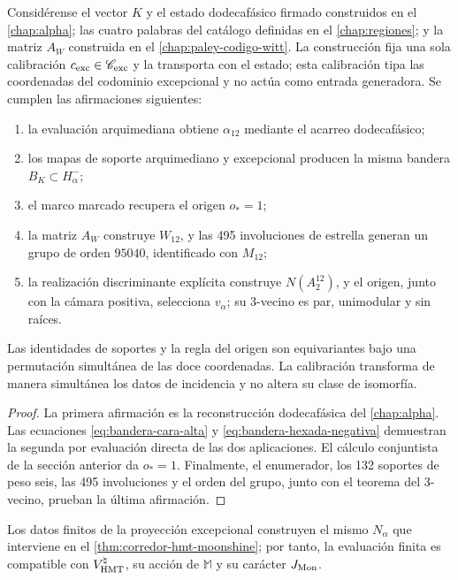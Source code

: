 \begin{theorem}
Considérense el vector \(K\) y el estado dodecafásico firmado construidos en
el \cref{chap:alpha}; las cuatro palabras del catálogo definidas en el
\cref{chap:regiones}; y la matriz \(A_W\) construida en el
\cref{chap:paley-codigo-witt}. La construcción fija una sola calibración
\(c_{\rm exc}\in\mathscr C_{\rm exc}\) y la transporta con el estado; esta
calibración tipa las coordenadas del codominio excepcional y no actúa como
entrada generadora. Se cumplen las afirmaciones siguientes:
\begin{enumerate}
  \item la evaluación arquimediana obtiene \(\alpha_{12}\) mediante el acarreo
  dodecafásico;
  \item los mapas de soporte arquimediano y excepcional producen la misma bandera
  \(B_K\subset H^-_\alpha\);
  \item el marco marcado recupera el origen \(o_*=1\);
  \item la matriz \(A_W\) construye \(W_{12}\), y las 495 involuciones de
  estrella generan un grupo de orden \(95040\), identificado con \(M_{12}\);
  \item la realización discriminante explícita construye \(N(A_2^{12})\),
  y el origen, junto con la cámara positiva, selecciona \(v_\alpha\); su
  3-vecino es par, unimodular y sin raíces.
\end{enumerate}
Las identidades de soportes y la regla del origen son equivariantes bajo una
permutación simultánea de las doce coordenadas. La calibración transforma de
manera simultánea los datos de incidencia y no altera su clase de isomorfía.
\end{theorem}

\begin{proof}
La primera afirmación es la reconstrucción dodecafásica del
\cref{chap:alpha}. Las ecuaciones
\eqref{eq:bandera-cara-alta} y \eqref{eq:bandera-hexada-negativa} demuestran
la segunda por evaluación directa de las dos aplicaciones. El cálculo conjuntista
de la sección anterior da \(o_*=1\). Finalmente, el enumerador, los 132
soportes de peso seis, las 495 involuciones y el orden del grupo, junto con el
teorema del 3-vecino, prueban la última afirmación.
\end{proof}

\begin{corollary}
Los datos finitos de la proyección excepcional construyen el mismo
\(N_\alpha\) que interviene en el
\cref{thm:corredor-hmt-moonshine}; por tanto, la evaluación finita es
compatible con \(V^\natural_{\rm HMT}\), su acción de \(\mathbb M\) y su
carácter \(J_{\rm Mon}\).
\end{corollary}


